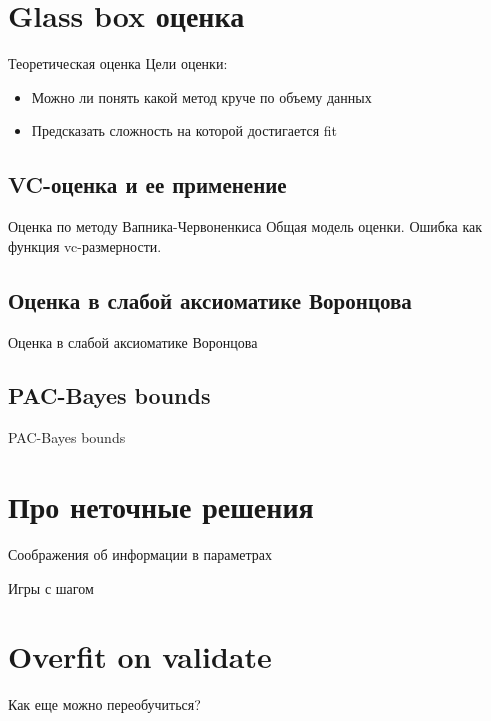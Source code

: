 \documentclass[14pt, fleqn, xcolor={dvipsnames, table}]{beamer}
\begin{document}
\section{Glass box оценка}
\begin{frame}{Теоретическая оценка}
Цели оценки:
\begin{itemize}
  \item Можно ли понять какой метод круче по объему данных
  \item Предсказать сложность на которой достигается fit
\end{itemize}
\end{frame}

\subsection{VC-оценка и ее применение}
\begin{frame}{Оценка по методу Вапника-Червоненкиса}
Общая модель оценки.
Ошибка как функция vc-размерности.
\end{frame}

\subsection{Оценка в слабой аксиоматике Воронцова}
\begin{frame}{Оценка в слабой аксиоматике Воронцова}
\end{frame}

\subsection{PAC-Bayes bounds}
\begin{frame}{PAC-Bayes bounds}
\end{frame}

\section{Про неточные решения}
\begin{frame}{Соображения об информации в параметрах}
\end{frame}

\begin{frame}{Игры с шагом}
\end{frame}

\section{Overfit on validate}
\begin{frame}{Как еще можно переобучиться?}
\end{frame}
\end{document}
